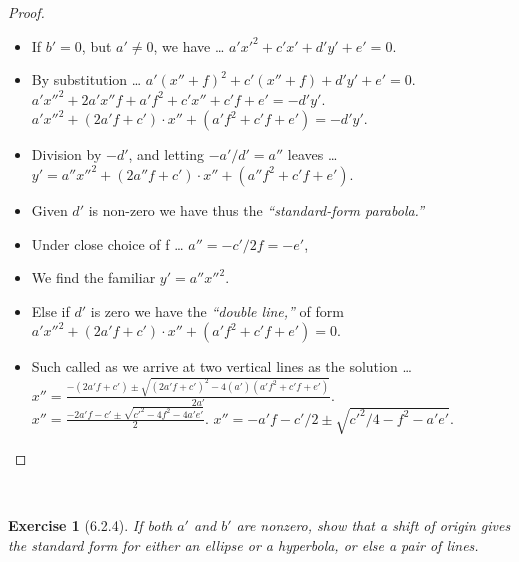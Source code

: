 \documentclass[12pt]{article}
\newcommand{\XB}{\color{black}}
\newcommand{\XBB}{\color{blue}}
\newcommand{\ds}{\displaystyle}
\theoremstyle{plain}
\newtheorem{ex}{Exercise}
\begin{document}
\begin{proof}
  \ \\

  \begin{itemize}
    \item If $ b' = 0 $, but $ a' \neq 0 $, we have \dots
    \subitem $ \ds a'x'^{2} + c'x' + d'y' + e' = 0 $.
    \item By substitution \dots
    \subitem $ \ds a'(x'' + f)^{2} + c'(x'' + f) + d'y' + e' = 0 $.
    \subitem $ \ds a'x''^{2} + 2a'x''f + a'f^{2} + c'x'' + c'f + e' = - d'y' $.
    \subitem $ \ds a'x''^{2} + (2a'f + c') \cdot x'' + (a'f^{2} + c'f + e') = - d'y' $.
    \item Division by $ -d' $, and letting $ -a'/d' = a'' $ leaves \dots
    \subitem $ \ds y' = a''x''^{2} + (2a''f + c') \cdot x'' + (a''f^{2} + c'f + e') $.
    \item Given $ d' $ is non-zero we have thus the \textit{``standard-form parabola.''}
    \item Under close choice of f \dots
    \subitem $ \ds a'' = - c'/2f = - e' $,
    \item We find the familiar $ \ds y' = a''x''^{2} $.
    \item Else if $ d' $ is zero we have the \textit{``double line,''} of form
    \subitem $ \ds a'x''^{2} + (2a'f + c') \cdot x'' + (a'f^{2} + c'f + e') = 0 $.
    \item Such called as we arrive at two vertical lines as the solution \dots
    \subitem $ \ds x'' = \frac{\ds -(2a'f + c') \pm \sqrt{(2a'f + c')^{2} - 4(a')(a'f^{2} + c'f + e')}}{2a'} $.
    \subitem $ \ds x'' = \frac{\ds -2a'f - c' \pm \sqrt{c'^{2} - 4f^{2} - 4a'e'}}{2} $.
    \subitem $ \ds x'' = \ds -a'f - c'/2 \pm \sqrt{c'^{2}/4 - f^{2} - a'e'} $.
  \end{itemize}

\end{proof}

\newpage


\XBB\hrulefill\XB \\
\begin{ex} [6.2.4]
  If both $ a' $ and $ b' $ are nonzero,
  show that a shift of origin gives the standard form for either an ellipse or a hyperbola, or else a pair of lines.
\end{ex}
\XBB\hrulefill\XB \\
\end{document}
